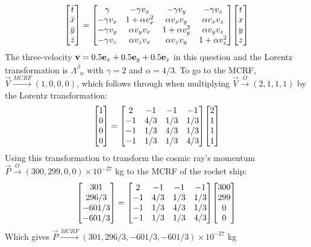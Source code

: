 \documentclass{report}
\begin{document}
\begin{subquests}
\begin{subquests}
		\begin{gather*}
			\mqty[
		 		\bar{t} \\
				\bar{x} \\
				\bar{y} \\
				\bar{z}
			] =
			\mqty[
				\gamma & -\gamma v_x & -\gamma v_y & -\gamma v_z \\
				-\gamma v_x & 1 + \alpha {v}^2_x & \alpha v_x v_y & \alpha v_x v_z \\
				-\gamma v_y & \alpha v_y v_x & 1 + \alpha {v}^2_y & \alpha v_y v_z \\
				-\gamma v_z & \alpha v_z v_x & \alpha v_z v_y & 1 + \alpha {v}^2_z
			]
			\mqty[
		 		{t} \\
				{x} \\
				{y} \\
				{z}
			] 	
		\end{gather*}
		The three-velocity ${\vb v} = 0.5{\vb e}_x + 0.5{\vb e}_y + 0.5{\vb e}_z$ in this question and the Lorentz transformation is $\Lambda^{\bar \beta}_{\;\;\alpha}$ with $\gamma = 2$ and $\alpha = 4/3$. To go to the MCRF, $ {\vec V} \stackrel{MCRF}\longrightarrow (1, 0, 0, 0)$, which follows through when multiplying $ {\vec V} \stackrel{O}\longrightarrow (2, 1, 1, 1) $ by the Lorentz transformation:
		\begin{gather*}
			\mqty[
		 		{1} \\
				{0} \\
				{0} \\
				{0}
			] =
			\mqty[
				2 & -1 & -1 & -1 \\
				-1 & 4/3 & 1/3 & 1/3 \\
				-1 & 1/3 & 4/3 & 1/3 \\
				-1 & 1/3 & 1/3 & 4/3
			]
			\mqty[
		 		{2} \\
				{1} \\
				{1} \\
				{1}
			]
		\end{gather*}
		Using this transformation to transform the cosmic ray's momentum ${\vec P} \stackrel{O} \longrightarrow (300, 299, 0, 0) \times 10^{-27}$ kg to the MCRF of the rocket ship:
		\begin{gather*}
			\mqty[
		 		{301} \\[0.3 pt]
				{296/3} \\[0.3 pt]
				{-601/3} \\[0.3 pt]
				{-601/3}
			] =
			\mqty[
				2 & -1 & -1 & -1 \\
				-1 & 4/3 & 1/3 & 1/3 \\
				-1 & 1/3 & 4/3 & 1/3 \\
				-1 & 1/3 & 1/3 & 4/3
			]
			\mqty[
		 		{300} \\[0.3 pt]
				{299} \\[0.3 pt]
				{0} \\[0.3 pt]
				{0}
			]
		\end{gather*}
		Which gives ${\vec P} \stackrel{MCRF} \longrightarrow (301, 296/3, -601/3, -601/3) \times 10^{-27}$ kg \\\\
		

\end{subquests}
\end{subquests}
\end{document}
